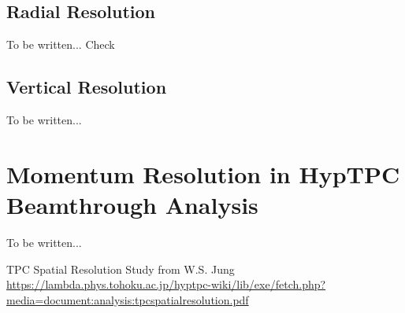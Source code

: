 \documentclass{article}
\begin{document}
	\subsection{Radial Resolution}
	To be written... Check \cite{TPCRes}
	\subsection{Vertical Resolution}
	To be written...
	\section{Momentum Resolution in HypTPC Beamthrough Analysis}
	To be written...
	\begin{thebibliography}{}
		TPC Spatial Resolution Study from W.S. Jung\\
		\href{https://lambda.phys.tohoku.ac.jp/hyptpc-wiki/lib/exe/fetch.php?media=document:analysis:tpcspatialresolution.pdf}%
		{https://lambda.phys.tohoku.ac.jp/hyptpc-wiki/lib/exe/fetch.php?media=document:analysis:tpcspatialresolution.pdf}
	\end{thebibliography}
\end{document}
